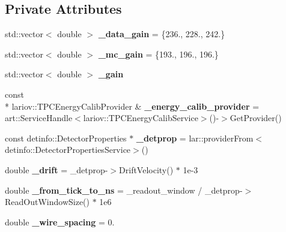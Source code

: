 \subsection*{Private Attributes}
\begin{DoxyCompactItemize}
\item 
\hypertarget{group__lee_gab80c71d066234aa8f0b483c34a068d55}{std\-::vector$<$ double $>$ {\bfseries \-\_\-data\-\_\-gain} = \{236., 228., 242.\}}\label{group__lee_gab80c71d066234aa8f0b483c34a068d55}

\item 
\hypertarget{group__lee_ga5c5abe13d6a7820e1658a802790f7e80}{std\-::vector$<$ double $>$ {\bfseries \-\_\-mc\-\_\-gain} = \{193., 196., 196.\}}\label{group__lee_ga5c5abe13d6a7820e1658a802790f7e80}

\item 
\hypertarget{group__lee_ga9f16c348e247cda52785e968cfad1b91}{std\-::vector$<$ double $>$ {\bfseries \-\_\-gain}}\label{group__lee_ga9f16c348e247cda52785e968cfad1b91}

\item 
\hypertarget{group__lee_ga4cc0815f3fccf5f704c44fc0a5ed0717}{const \\*
lariov\-::\-T\-P\-C\-Energy\-Calib\-Provider \& {\bfseries \-\_\-energy\-\_\-calib\-\_\-provider} = art\-::\-Service\-Handle$<$lariov\-::\-T\-P\-C\-Energy\-Calib\-Service$>$()-\/$>$Get\-Provider()}\label{group__lee_ga4cc0815f3fccf5f704c44fc0a5ed0717}

\item 
\hypertarget{group__lee_ga5dc96ef9f0d974147c51ca27e46351fa}{const detinfo\-::\-Detector\-Properties $\ast$ {\bfseries \-\_\-detprop} = lar\-::provider\-From$<$detinfo\-::\-Detector\-Properties\-Service$>$()}\label{group__lee_ga5dc96ef9f0d974147c51ca27e46351fa}

\item 
\hypertarget{group__lee_ga5ee65f3a1c672b4f089c05ba6b4ab132}{double {\bfseries \-\_\-drift} = \-\_\-detprop-\/$>$Drift\-Velocity() $\ast$ 1e-\/3}\label{group__lee_ga5ee65f3a1c672b4f089c05ba6b4ab132}

\item 
\hypertarget{group__lee_ga12d5d0f2b40a3971d57e37b1d176e45d}{double {\bfseries \-\_\-from\-\_\-tick\-\_\-to\-\_\-ns} = \-\_\-readout\-\_\-window / \-\_\-detprop-\/$>$Read\-Out\-Window\-Size() $\ast$ 1e6}\label{group__lee_ga12d5d0f2b40a3971d57e37b1d176e45d}

\item 
\hypertarget{group__lee_ga412905c2b45aa8103823f84f7bd7ea2a}{double {\bfseries \-\_\-wire\-\_\-spacing} = 0.}\label{group__lee_ga412905c2b45aa8103823f84f7bd7ea2a}


\end{DoxyCompactItemize}
